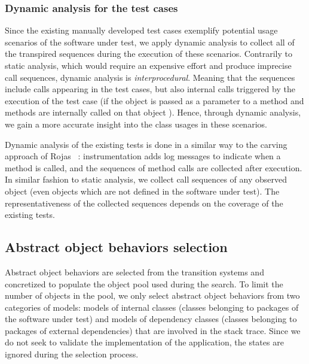 \subsubsection{Dynamic analysis for the test cases}
\label{ssec:dynamicanalysis}

Since the existing manually developed test cases exemplify potential usage scenarios of the software under test, we apply dynamic analysis to collect all of the transpired sequences during the execution of these scenarios. Contrarily to static analysis, which would require an expensive effort and produce imprecise call sequences, dynamic analysis is \emph{interprocedural}. Meaning that the sequences include calls appearing in the test cases, but also internal calls triggered by the execution of the test case (\eg if the object is passed as a parameter to a method and methods are internally called on that object ). Hence, through dynamic analysis, we gain a more accurate insight into the class usages in these scenarios.

Dynamic analysis of the existing tests is done in a similar way to the carving approach of Rojas \etal~\cite{Rojas2016}: instrumentation adds log messages to indicate when a method is called, and the sequences of method calls are collected after execution. In similar fashion to static analysis, we collect call sequences of any observed object (even objects which are not defined in the software under test).
The representativeness of the collected sequences depends on the coverage of the existing tests.



\subsection{Abstract object behaviors selection}
\label{ssec:abstract-selection}

Abstract object behaviors are selected from the transition systems and concretized to populate the object pool used during the search.
%
To limit the number of objects in the pool, we only select abstract object behaviors from two categories of models:  models of internal classes (\ie classes belonging to packages of the software under test) and models of dependency classes (\ie classes belonging to packages of external dependencies) that are involved in the stack trace.
Since we do not seek to validate the implementation of the application, the states are ignored during the selection process.

